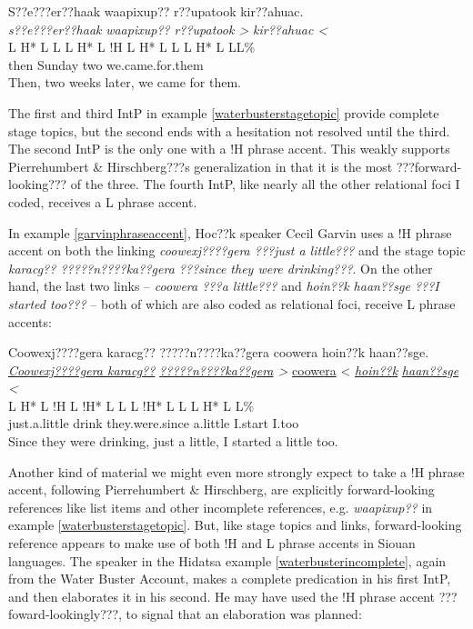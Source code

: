 \documentclass[output=paper]{LSP/langsci}
\begin{document}
\ea\label{waterbusterstagetopic}
S??e???er??haak waapixup?? r??upatook kir??ahuac.\footnotemark\\
\glll	\emph{s??e???er??haak}		\emph{waapixup??}		\emph{r??upatook >	}	\emph{kir??ahuac <}\\
	{\ob L H* L L\cb}		{\ob L H* L !H\cb}		{\ob L H* L L\cb}		{\ob L H* L L\cb{}L\%}\\
	then				Sunday			two				we.came.for.them\\
\glt	Then, two weeks later, we came for them.
\z

The first and third IntP in example \ref{waterbusterstagetopic} provide complete stage topics, but the second ends with a hesitation not resolved until the third. The second IntP is the only one with a !H phrase accent. This weakly supports Pierrehumbert \& Hirschberg???s generalization in that it is the most ???forward-looking??? of the three. The fourth IntP, like nearly all the other relational foci I coded, receives a L phrase accent.

In example \ref{garvinphraseaccent}, Hoc??k speaker Cecil Garvin uses a !H phrase accent on both the linking \emph{coowexj????gera ???just a little???} and the stage topic \emph{karacg?? ?????n????ka??gera ???since they were drinking???}. On the other hand, the last two links -- \emph{coowera ???a little???} and \emph{hoin??k	haan??sge ???I started too???} -- both of which are also coded as relational foci, receive L phrase accents:

\ea\label{garvinphraseaccent}
 	Coowexj????gera karacg?? ?????n????ka??gera coowera hoin??k haan??sge.\footnotemark\\
\glll	\emph{\underline{Coowexj????gera	}}	\emph{\underline{karacg??}}	\emph{\underline{?????n????ka??gera}	>}	{\underline{coowera} <}	\emph{\underline{hoin??k}}	\emph{\underline{haan??sge} <}\\
	{\ob L H* L !H\cb}				{\ob L !H* L}				{L\cb}	{\ob L !H* L L\cb}		{\ob L H* L}						{\hspaceThis{haan??s}\ob{}L\%}\\
	just.a.little					drink					they.were.since				a.little				I.start						I.too\\
\glt	Since they were drinking, just a little, I started a little too.
\z

Another kind of material we might even more strongly expect to take a !H phrase accent, following Pierrehumbert \& Hirschberg, are explicitly forward-looking references like list items and other incomplete references, e.g. \emph{waapixup??} in example \ref{waterbusterstagetopic}. But, like stage topics and links, forward-looking reference appears to make use of both !H and L phrase accents in Siouan languages. The speaker in the Hidatsa example \ref{waterbusterincomplete}, again from the Water Buster Account, makes a complete predication in his first IntP, and then elaborates it in his second. He may have used the !H phrase accent ???foward-lookingly???, to signal that an elaboration was planned:
\end{document}
